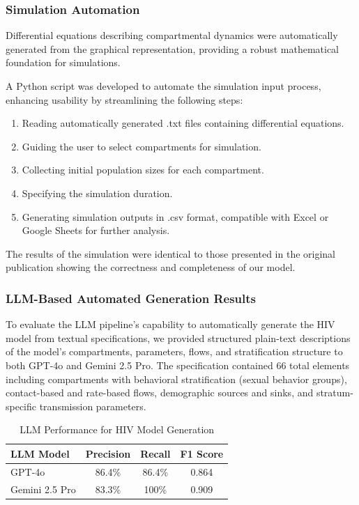 \subsubsection{Simulation Automation}

Differential equations describing compartmental dynamics were automatically generated from the graphical representation, providing a robust mathematical foundation for simulations.

A Python script was developed to automate the simulation input process, enhancing usability by streamlining the following steps:
\begin{enumerate}
    \item Reading automatically generated .txt files containing differential equations.
    \item Guiding the user to select compartments for simulation.
    \item Collecting initial population sizes for each compartment.
    \item Specifying the simulation duration.
    \item Generating simulation outputs in .csv format, compatible with Excel or Google Sheets for further analysis.
\end{enumerate}
The results of the simulation were identical to those presented in the original publication showing the correctness and completeness of our model.



\subsubsection{LLM-Based Automated Generation Results}



To evaluate the LLM pipeline's capability to automatically generate the HIV model from textual specifications, we provided structured plain-text descriptions of the model's compartments, parameters, flows, and stratification structure to both GPT-4o and Gemini 2.5 Pro. The specification contained 66 total elements including compartments with behavioral stratification (sexual behavior groups), contact-based and rate-based flows, demographic sources and sinks, and stratum-specific transmission parameters.

\begin{table}[htbp]
\centering
\caption{LLM Performance for HIV Model Generation}
\label{tab:hiv_llm_performance}
\begin{tabular}{lccc}
\hline
\textbf{LLM Model} & \textbf{Precision} & \textbf{Recall} & \textbf{F1 Score} \\
\hline
GPT-4o & 86.4\% & 86.4\% & 0.864 \\
Gemini 2.5 Pro & 83.3\% & 100\% & 0.909 \\
\hline
\end{tabular}
\end{table}

